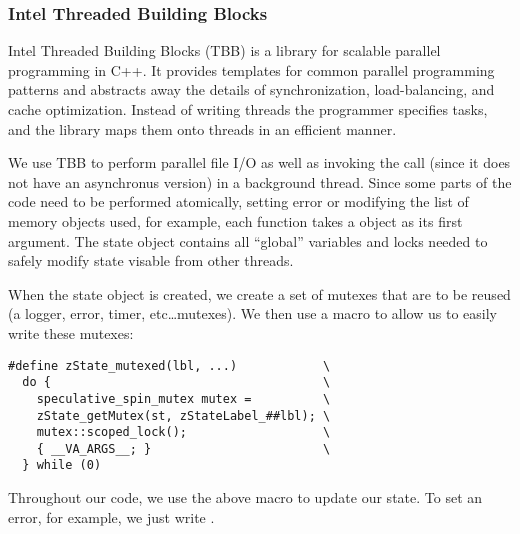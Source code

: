 
\subsubsection{Intel Threaded Building Blocks}
Intel Threaded Building Blocks\cite{reinders2007intel} (TBB) is a library for
scalable parallel
programming in C++. It provides templates for common parallel programming
patterns and abstracts away the details of synchronization, load-balancing,
and cache optimization. Instead of writing threads the programmer specifies
tasks, and the library maps them onto threads in an efficient manner.

We use TBB to perform parallel file I/O as well as invoking the
	 call (since it does not have an asynchronus version)
	in a background thread.
Since some parts of the code need to be performed atomically, 
	setting error or modifying the list of memory objects used, for example,
	each function takes a  object as its first argument.
The state object contains all ``global'' variables and locks needed to 
	safely modify state visable from other threads.


When the state object is created, we create a set of mutexes that
	are to be reused (a logger, error, timer, etc\ldots mutexes).
We then use a macro to allow us to easily write these mutexes:

\begin{verbatim}
#define zState_mutexed(lbl, ...)            \
  do {                                      \
    speculative_spin_mutex mutex =          \
    zState_getMutex(st, zStateLabel_##lbl); \
    mutex::scoped_lock();                   \
    { __VA_ARGS__; }                        \
  } while (0)
\end{verbatim}


Throughout our code, we use the above macro to update our state.
To set an error, for example, we just write .

